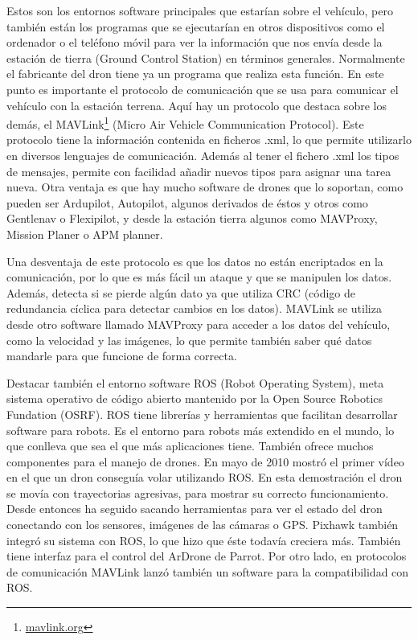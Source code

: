 Estos son los entornos software principales que estarían sobre el vehículo, pero también están los programas que se ejecutarían en otros dispositivos como el ordenador o el teléfono móvil para ver la información que nos envía desde la estación de tierra (Ground Control Station) en términos generales. Normalmente el fabricante del dron tiene ya un programa que realiza esta función. En este punto es importante el protocolo de comunicación que se usa para comunicar el vehículo con la estación terrena. Aquí hay un protocolo que destaca sobre los demás, el MAVLink\footnote{\url{mavlink.org}} (Micro Air Vehicle Communication Protocol). Este protocolo tiene la información contenida en ficheros .xml, lo que permite utilizarlo en diversos lenguajes de comunicación. Además al tener el fichero .xml los tipos de mensajes, permite con facilidad añadir nuevos tipos para asignar una tarea nueva. Otra ventaja es que hay mucho software de drones que lo soportan, como pueden ser Ardupilot, Autopilot, algunos derivados de éstos y otros como Gentlenav o Flexipilot, y desde la estación tierra algunos como MAVProxy, Mission Planer o APM planner. 

Una desventaja de este protocolo es que los datos no están encriptados en la comunicación, por lo que es más fácil un ataque y que se manipulen los datos. Además, detecta si se pierde algún dato ya que utiliza CRC (código de redundancia cíclica para detectar cambios en los datos). MAVLink se utiliza desde otro software llamado MAVProxy para acceder a los datos del vehículo, como la velocidad y las imágenes, lo que permite también saber qué datos mandarle para que funcione de forma correcta. 

Destacar también el entorno software ROS (Robot Operating System), meta sistema operativo de código abierto mantenido por la Open Source Robotics Fundation (OSRF). ROS tiene librerías y herramientas que facilitan desarrollar software para robots. Es el entorno para robots más extendido en el mundo, lo que conlleva que sea el que más aplicaciones tiene. También ofrece muchos componentes para el manejo de drones. En mayo de 2010 mostró el primer vídeo en el que un dron conseguía volar utilizando ROS. En esta demostración el dron se movía con trayectorias agresivas, para mostrar su correcto funcionamiento. Desde entonces ha seguido sacando herramientas para ver el estado del dron conectando con los sensores, imágenes de las cámaras o GPS. Pixhawk también integró su sistema con ROS, lo que hizo que éste todavía creciera más. También tiene interfaz para el control del ArDrone de Parrot. Por otro lado, en protocolos de comunicación MAVLink lanzó también un software para la compatibilidad con ROS. 

